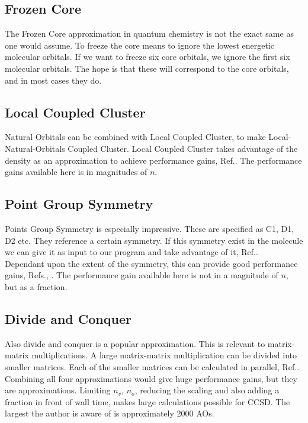 \documentclass[a4paper,norsk,11pt,twoside]{report}
\begin{document}
\subsection{Frozen Core}
The Frozen Core approximation in quantum chemistry is not the exact same as one would assume. To freeze the core means to ignore the lowest energetic molecular orbitals. If we want to freeze six core orbitals, we ignore the first six molecular orbitals. The hope is that these will correspond to the core orbitals, and in most cases they do. 

\subsection{Local Coupled Cluster}
Natural Orbitals can be combined with Local Coupled Cluster, to make Local-Natural-Orbitals Coupled Cluster. Local Coupled Cluster takes advantage of the density as an approximation to achieve performance gains, Ref.\cite{natural_orbitals_ccsd2}. The performance gains available here is in magnitudes of $n$. 

\subsection{Point Group Symmetry}
Points Group Symmetry is especially impressive. These are specified as C1, D1, D2 etc. They reference a certain symmetry. If this symmetry exist in the molecule we can give it as input to our program and take advantage of it, Ref.\cite{point_group_1}. \\

Dependant upon the extent of the symmetry, this can provide good performance gains, Refs.\cite{ccsd_fac2}, \cite{ccsd_fac3}. The performance gain available here is not in a magnitude of $n$, but as a fraction. 

\subsection{Divide and Conquer}
Also divide and conquer is a popular approximation. This is relevant to matrix-matrix multiplications. A large matrix-matrix multiplication can be divided into smaller matrices. Each of the smaller matrices can be calculated in parallel, Ref.\cite{divide_and_conquer}. \\

Combining all four approximations would give huge performance gains, but they are approximations. Limiting $n_v$, $n_o$, reducing the scaling and also adding a fraction in front of wall time, makes large calculations possible for CCSD. The largest the author is aware of is approximately 2000 AOs. \\
\end{document}
